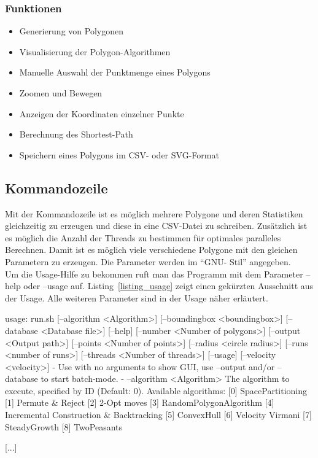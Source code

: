     \subsubsection{Funktionen}

      \begin{itemize}
        \item Generierung von Polygonen
        \item Visualisierung der Polygon-Algorithmen
        \item Manuelle Auswahl der Punktmenge eines Polygons
        \item Zoomen und Bewegen
        \item Anzeigen der Koordinaten einzelner Punkte
        \item Berechnung des Shortest-Path
        \item Speichern eines Polygons im CSV- oder SVG-Format
      \end{itemize}

  \subsection{Kommandozeile}

    Mit der Kommandozeile ist es möglich mehrere Polygone und deren Statistiken
    gleichzeitig zu erzeugen und diese in eine CSV-Datei zu schreiben.
    Zusätzlich ist es möglich die Anzahl der Threads zu bestimmen für optimales
    paralleles Berechnen. Damit ist es möglich viele verschiedene Polygone mit
    den gleichen Parametern zu erzeugen. Die Parameter werden im \enquote{GNU-
    Stil} angegeben.\\ Um die Usage-Hilfe zu bekommen ruft man das Programm mit
    dem Parameter --help oder --usage auf. Listing~\ref{listing_usage} zeigt
    einen gekürzten Ausschnitt aus der Usage. Alle weiteren Parameter sind in
    der Usage näher erläutert.

\begin{code}[caption={Usage der Kommandozeile},label=listing_usage]
usage: run.sh [--algorithm <Algorithm>] [--boundingbox <boundingbox>]
       [--database <Database file>] [--help] [--number <Number of
       polygons>] [--output <Output path>] [--points <Number of points>]
       [--radius <circle radius>] [--runs <number of runs>] [--threads
       <Number of threads>] [--usage] [--velocity <velocity>]
-
Use with no arguments to show GUI, use --output and/or --database to start
batch-mode.
-
    --algorithm <Algorithm>         The algorithm to execute, specified by
                                    ID (Default: 0). Available algorithms:
                                    [0] SpacePartitioning
                                    [1] Permute & Reject
                                    [2] 2-Opt moves
                                    [3] RandomPolygonAlgorithm
                                    [4] Incremental Construction &
                                    Backtracking
                                    [5] ConvexHull
                                    [6] Velocity Virmani
                                    [7] SteadyGrowth
                                    [8] TwoPeasants

[...]
\end{code}

